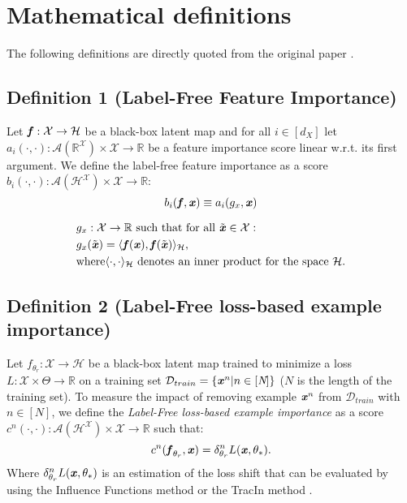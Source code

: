 \appendix

\section{Mathematical definitions}
The following definitions are directly quoted from the original paper \cite{LabelFreeExplainability}.
\label{appendix:math}
\subsection{Definition 1 (Label-Free Feature Importance)}
\label{appendix:LFIdef1}
Let $\textbf{\textit{f}} : \mathcal{X} \rightarrow \mathcal{H}$ be a black-box latent map and for all $i \in [d_X]$ let $a_i(·, ·) : \mathcal{A}(\mathbb{R}^\mathcal{X}) \times \mathcal{X} \rightarrow \mathbb{R}$ be a feature importance score linear w.r.t. its first argument. We define the label-free feature importance as a score $b_i(·, ·) : \mathcal{A}(\mathcal{H}^\mathcal{X}) \times \mathcal{X} \rightarrow \mathbb{R}$:
\begin{equation*}
b_i(\qvec{f}, \qvec{x}) \equiv a_i(g_x,\qvec{x}) \newline
\end{equation*}

\begin{equation*}
\begin{aligned}
& g_x: \mathcal{X} \rightarrow \mathbb{R} \textnormal{  such that for all  } \Tilde{\textbf{\textit{x}}} \in \mathcal{X} : \\
& g_x(\Tilde{\textbf{\textit{x}}}) = \langle \textbf{\textit{f}}(\textbf{\textit{x}}), \textbf{\textit{f}}(\Tilde{\textbf{\textit{x}}}) \rangle_\mathcal{H},\\
& \textnormal{where$\langle \cdot , \cdot \rangle_{\mathcal{H}} $ denotes an inner product for the space $\mathcal{H}$.}
\end{aligned}
\end{equation*}


\subsection{Definition 2 (Label-Free loss-based example importance)}
\label{appendix:LEIdef1}
Let $f_{\theta_r} : \mathcal{X} \rightarrow \mathcal{H}$ be a black-box latent map trained to minimize a loss $L :  \mathcal{X} \times \Theta \rightarrow \mathbb{R}$ on a training set $\mathcal{D}_{train} = \{ \textbf{\textit{x}}^n | n \in [\textit{N}] \}$ ($N$ is the length of the training set). To measure the impact of removing example $\textbf{\textit{x}}^n$ from $\mathcal{D}_{train}$ with $n \in [\textit{N}]$, we define the \textit{Label-Free loss-based example importance} as a score $c^n(\cdot,\cdot) : \mathcal{A}(\mathcal{H}^\mathcal{X}) \times \mathcal{X} \rightarrow \mathbb{R}$ such that:
\begin{equation}
    c^n(\textbf{\textit{f}}_{\theta_r}, \textbf{\textit{x}}) = \mathbf{\delta}^n_{\theta_r}L(\textbf{\textit{x}}, \mathbf{\theta}_*).
\end{equation}
Where $ \delta^n_{\theta_r}L(\textbf{\textit{x}}, \theta_*)$ is an estimation of the loss shift that can be evaluated by using the Influence Functions method\cite{koh2017understanding} or the TracIn method \cite{pruthi2020estimating}.

